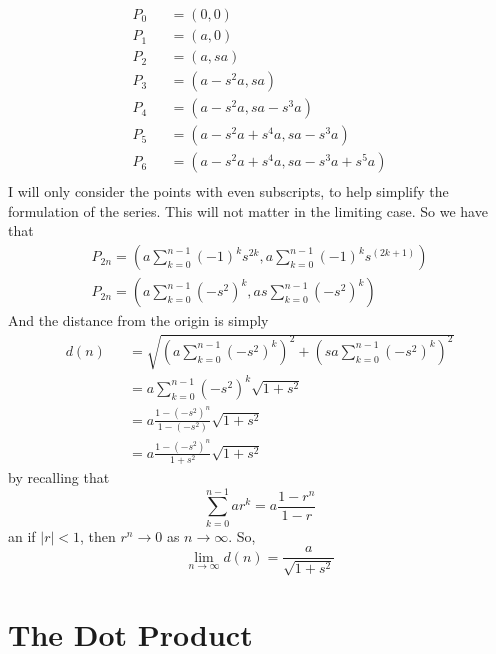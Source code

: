 \documentclass[12pt]{amsbook}
\begin{document}
\begin{eqnarray*}
P_0&&=(0,0) \\
P_1&&=(a,0)\\
P_2&&=(a,sa)\\
P_3&&=(a-s^2a,sa)\\
P_4&&=(a-s^2a,sa-s^3a)\\
P_5&&=(a-s^2a+s^4a,sa-s^3a)\\
P_6&&=(a-s^2a+s^4a,sa-s^3a+s^5a)\\
\end{eqnarray*}
I will only consider the points with even subscripts, to help simplify the formulation of the series. This will not matter in the limiting case. So we have that 
\begin{eqnarray*}
P_{2n}=(a\sum_{k=0}^{n-1}(-1)^ks^{2k},a\sum_{k=0}^{n-1}(-1)^ks^{(2k+1)}) \\
P_{2n}=(a\sum_{k=0}^{n-1}(-s^2)^k,as\sum_{k=0}^{n-1}(-s^2)^k)
\end{eqnarray*}
And the distance from the origin is simply
\begin{eqnarray*}
d(n)&&=\sqrt{(a\sum_{k=0}^{n-1}(-s^2)^k)^2+(sa\sum_{k=0}^{n-1}(-s^2)^k)^2} \\
&&=a\sum_{k=0}^{n-1}(-s^2)^k\sqrt{1+s^2} \\
&&=a\frac{1-(-s^2)^n}{1-(-s^2)}\sqrt{1+s^2} \\
&&=a\frac{1-(-s^2)^n}{1+s^2}\sqrt{1+s^2}
\end{eqnarray*}
by recalling that 
$$\sum_{k=0}^{n-1}ar^k=a\frac{1-r^n}{1-r}$$
an if $|r|<1$, then $r^n \rightarrow 0$ as $n \rightarrow \infty$. So,
$$\lim_{n \rightarrow \infty}d(n)=\frac{a}{\sqrt{1+s^2}}$$
\newpage
\section{The Dot Product}
\end{document}

